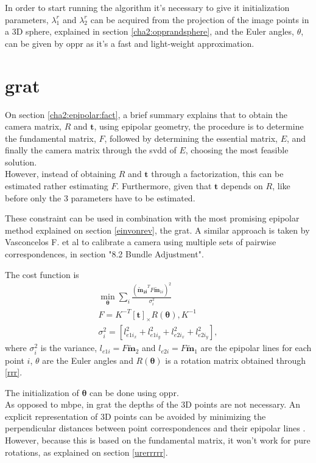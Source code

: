 In order to start running the algorithm it's necessary to give it initialization parameters, $\lambda_{1}^r$ and $\lambda_{2}^r$ can be acquired from the projection of the image points in a 3D sphere, explained in section \ref{cha2:opprandsphere}, and the Euler angles, $\theta$, can be given by \acrlong{oppr} as it's a fast and light-weight approximation.

\section{\acrlong{grat}}
On section \ref{cha2:epipolar:fact}, a brief summary explains that to obtain the camera matrix, $R$ and $\mathbf{t}$, using epipolar geometry, the procedure is to determine the fundamental matrix, $F$, followed by determining the essential matrix, $E$, and finally the camera matrix through the \acrshort{svdd} of $E$, choosing the most feasible solution.\\
However, instead of obtaining $R$ and $\mathbf{t}$ through a factorization, this can be estimated rather estimating $F$. Furthermore, given that $\mathbf{t}$ depends on $R$, like before only the 3 parameters have to be estimated. 

These constraint can be used in combination with the most promising epipolar method explained on section \ref{einvonrev}, the \acrlong{grat}. A similar approach is taken by Vasconcelos F. et al \cite{vasconcelos}
to calibrate a camera using multiple sets of pairwise correspondences, in section "8.2 Bundle Adjustment". 

The cost function is
\begin{align}
\min_\mathbf{\theta} \sum_i \frac{ (\mathbf{\widetilde{\mathbf{m}}_{2i}}^T F \widetilde{\mathbf{m}}_{1i})^2}{\sigma_i^2}\\
F = K^{-T} [\mathbf{t}]_\times R(\mathbf{ \theta}), K^{-1}\\
\sigma_i^2 =  [l_{{e1i}_x}^2 + l_{{e1i}_y}^2 + l_{{e2i}_x}^2 + l_{{e2i}_y}^2],
\end{align}
where $\sigma_i^2$ is the variance, $l_{e1i} = F\widetilde{\mathbf{m}}_{2}$ and $l_{e2i} = F\widetilde{\mathbf{m}}_{1}$ are the epipolar lines for each point $i$, $\theta$ are the Euler angles and $R(\mathbf{ \theta})$ is a rotation matrix obtained through \ref{rrr}.

The initialization of $\mathbf{ \theta}$ can be done using \acrlong{oppr}.\\

As opposed to \acrshort{mbpe}, in \acrshort{grat} the depths of the 3D points are not necessary. An explicit representation of 3D points can be avoided by minimizing the perpendicular distances between point correspondences and their epipolar lines \cite{vasconcelos} \cite{bundle}.
However, because this is based on the fundamental matrix, it won't work for pure rotations, as explained on section \ref{urerrrrr}.


